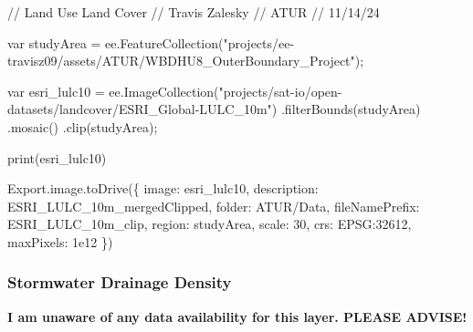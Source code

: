 \documentclass[
]{agujournal2019}
\newenvironment{Shaded}{\begin{snugshade}}{\end{snugshade}}
\newcommand{\NormalTok}[1]{\textcolor[rgb]{0.00,0.23,0.31}{#1}}
\begin{document}
\begin{Shaded}
\begin{Highlighting}[]
\NormalTok{// Land Use Land Cover}
\NormalTok{// Travis Zalesky}
\NormalTok{// ATUR}
\NormalTok{// 11/14/24}

\NormalTok{var studyArea = ee.FeatureCollection("projects/ee{-}travisz09/assets/ATUR/WBDHU8\_OuterBoundary\_Project");}

\NormalTok{var esri\_lulc10 = ee.ImageCollection("projects/sat{-}io/open{-}datasets/landcover/ESRI\_Global{-}LULC\_10m")}
\NormalTok{  .filterBounds(studyArea)}
\NormalTok{  .mosaic()}
\NormalTok{  .clip(studyArea);}
  
\NormalTok{print(esri\_lulc10)}

\NormalTok{Export.image.toDrive(\{}
\NormalTok{  image: esri\_lulc10, }
\NormalTok{  description: \textquotesingle{}ESRI\_LULC\_10m\_mergedClipped\textquotesingle{},}
\NormalTok{  folder: \textquotesingle{}ATUR/Data\textquotesingle{},}
\NormalTok{  fileNamePrefix: \textquotesingle{}ESRI\_LULC\_10m\_clip\textquotesingle{},}
\NormalTok{  region: studyArea,}
\NormalTok{  scale: 30,}
\NormalTok{  crs: \textquotesingle{}EPSG:32612\textquotesingle{},}
\NormalTok{  maxPixels: 1e12}
\NormalTok{\})}
\end{Highlighting}
\end{Shaded}

\subsubsection{Stormwater Drainage
Density}\label{stormwater-drainage-density}

\textbf{I am unaware of any data availability for this layer. PLEASE
ADVISE!}
\end{document}
